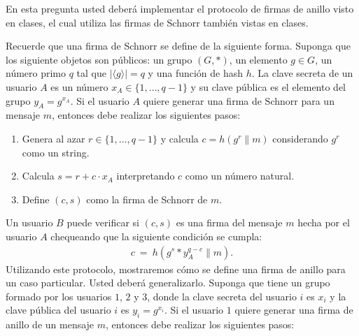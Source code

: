 
En esta pregunta usted deberá implementar el protocolo de firmas de
anillo visto en clases, el cual utiliza las firmas de Schnorr también
vistas en clases.

Recuerde que una firma de Schnorr se define de la siguiente
forma. Suponga que los siguiente objetos son públicos: un grupo $(G,
*)$, un elemento $g \in G$, un número primo $q$ tal que $|\langle
g\rangle| = q$ y una función de hash $h$. La clave secreta de un
usuario $A$ es un número $x_A \in \{1, \ldots, q -1\}$ y su clave
pública es el elemento del grupo $y_A = g^{x_A}$. Si el
usuario $A$ quiere generar una firma de Schnorr para un mensaje $m$,
entonces debe realizar los siguientes pasos:
\begin{enumerate}
\item Genera al azar $r \in \{1, \ldots, q-1\}$ y calcula $c = h(g^r \| m)$ considerando $g^r$ como un string.

\item Calcula $s = r + c \cdot x_A$ interpretando $c$ como un número natural.

\item Define $(c, s)$ como la firma de Schnorr de $m$.
\end{enumerate}
Un usuario $B$ puede verificar si $(c,s)$ es una firma del mensaje
$m$ hecha por el usuario $A$ chequeando que la siguiente condición se
cumpla:
\begin{align*}
c \ = \ h(g^s * y_A^{q-c} \| m).
\end{align*}
Utilizando este protocolo, mostraremos cómo se define una firma de anillo para un caso particular. Usted deberá generalizarlo. Suponga que tiene un grupo formado por los usuarios $1$, $2$ y $3$, donde la clave secreta del usuario $i$ es $x_i$ y la clave pública del usuario $i$ es $y_i = g^{x_i}$. Si el usuario $1$ quiere generar una firma de anillo de un mensaje $m$, entonces debe realizar los siguientes pasos:
